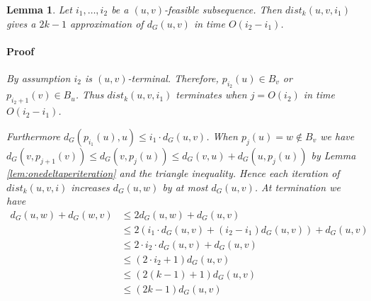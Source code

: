 \documentclass[12pt]{article}
\newtheorem{lem}[thm]{Lemma}
\begin{document}
\begin{lem}
Let $i_1, \hdots, i_2$ be a $(u,v)$-feasible subsequence. Then $dist_k(u,v,i_1)$ gives a $2k-1$ approximation of $d_G(u,v)$ in time $O(i_2-i_1)$.
\paragraph{Proof} By assumption $i_2$ is $(u,v)$-terminal. Therefore, $p_{i_2}(u) \in B_v$ or $p_{i_2 + 1}(v) \in B_u$. Thus $dist_k(u,v,i_1)$ terminates when $j=O(i_2)$ in time $O(i_2-i_1)$.

Furthermore $d_{G}(p_{i_1}(u),u) \leq i_1 \cdot d_G(u,v)$. When $p_j(u) = w \not\in B_v$
we have $d_G(v,p_{j+1}(v)) \leq d_G(v,p_{j}(u)) \leq d_G(v,u) + d_G(u,p_j(u))$ by Lemma \ref{lem:onedeltaperiteration} and the triangle inequality. Hence each iteration of $dist_k(u,v,i)$ increases $d_G(u,w)$ by at most $d_G(u,v)$. At termination we have
\begin{align*}
d_G(u,w) + d_G(w,v) &\leq 2d_G(u,w) + d_G(u,v) \\
&\leq 2(i_1 \cdot d_G(u,v) + (i_2 - i_1)d_G(u,v)) + d_G(u,v) \\
&\leq 2 \cdot i_2 \cdot d_G(u,v) + d_G(u,v) \\
&\leq (2 \cdot i_2 + 1)d_G(u,v) \\
&\leq (2 (k-1) + 1)d_G(u,v) \\
&\leq (2k-1) d_G(u,v)
\end{align*}
\end{lem}


\end{document}
